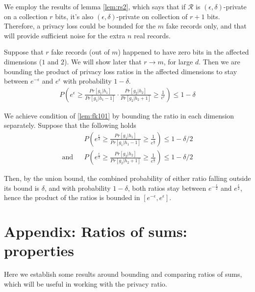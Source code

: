 \documentclass[11pt]{article}
\newcommand{\cR}{\mathcal{R}}
\begin{document}
We employ the results of lemma \eqref{lem:rs2}, which says that if $\cR$ is $(\epsilon, \delta)$-private on a collection $r$ bits, it's also $(\epsilon, \delta)$-private on collection of $r+1$ bits.  Therefore, a privacy loss could be bounded for the $m$ fake records only, and that will provide sufficient noise for the extra $n$ real records.  

Suppose that $r$ fake records (out of $m$) happened to have zero bits in the affected dimensions ($1$ and $2$).  We will show later that $r \to m$,  for  large $d$.  Then we are bounding the product of privacy loss ratios in the affected dimensions to stay between $e^{-\epsilon}$ and $e^\epsilon$ with probability $1-\delta$.
\begin{align} \label{lem:fk101}
P \left (   e^\epsilon \ge \frac{  Pr[ g_1 | h_1]  } {  Pr[ g_1 | h_1 - 1]  } \cdot \frac{  Pr[ g_2 | h_2]  } {  Pr[ g_2 | h_2 + 1]  }  \ge \frac{1}{e^\epsilon} \right ) \le 1 - \delta
\end{align}

We achieve condition of \eqref{lem:fk101} by bounding the ratio in each dimension separately.  Suppose that the following holds
\begin{align*} \label{lem:fk101}
&& P \left (   e^\frac{\epsilon}{2} \ge \frac{  Pr[ g_1 | h_1]  } {  Pr[ g_1 | h_1 - 1] }  \ge \frac{1}{e^\frac{\epsilon}{2}} \right ) \le 1 - \delta/2 \\
\text{and} && P \left (   e^\frac{\epsilon}{2} \ge \frac{  Pr[ g_2 | h_2]  } {  Pr[ g_2 | h_2 + 1]  }  \ge \frac{1}{e^\frac{\epsilon}{2}} \right ) \le 1 - \delta/2 
\end{align*}

Then, by the union bound, the combined probability of either ratio falling outside its bound is $\delta$, and with probability $1-\delta$, both ratios stay between $e^{-\frac{\epsilon}{2}}$ and $e^\frac{\epsilon}{2}$, hence the product of the ratios is bounded in $[ e^{-\epsilon}, e^\epsilon]$.   

\begin{prop}
\end{prop}



\section{Appendix: Ratios of sums: properties}

Here we establish some results around bounding and comparing ratios of sums, which will be useful in working with the privacy ratio.
\end{document}
